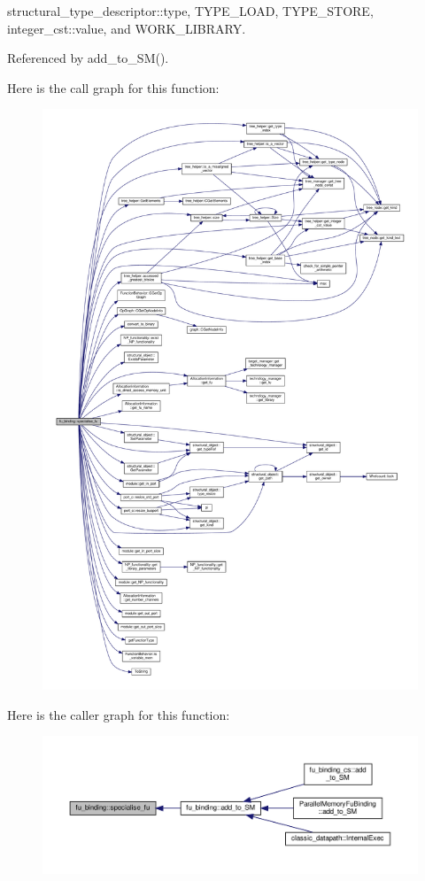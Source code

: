 structural\+\_\+type\+\_\+descriptor\+::type, T\+Y\+P\+E\+\_\+\+L\+O\+AD, T\+Y\+P\+E\+\_\+\+S\+T\+O\+RE, integer\+\_\+cst\+::value, and W\+O\+R\+K\+\_\+\+L\+I\+B\+R\+A\+RY.



Referenced by add\+\_\+to\+\_\+\+S\+M().

Here is the call graph for this function\+:
\nopagebreak
\begin{figure}[H]
\begin{center}
\leavevmode
\includegraphics[width=350pt]{d8/d04/classfu__binding_ab83a37f707ea824594822564d97060a4_cgraph}
\end{center}
\end{figure}
Here is the caller graph for this function\+:
\nopagebreak
\begin{figure}[H]
\begin{center}
\leavevmode
\includegraphics[width=350pt]{d8/d04/classfu__binding_ab83a37f707ea824594822564d97060a4_icgraph}
\end{center}
\end{figure}
